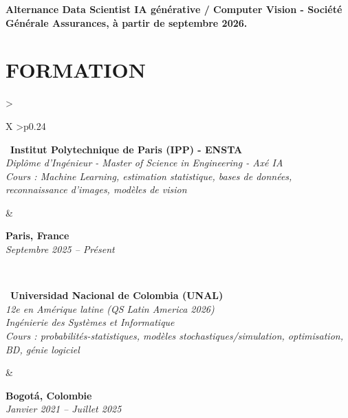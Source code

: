 \documentclass[letterpaper,10pt]{article}
\begin{document}
\textbf{Alternance Data Scientist IA générative / Computer Vision - Société Générale Assurances, à partir de septembre 2026.}


\vspace{-0.04cm}

\section{\textcolor{mydarkgreen}{\textbf{FORMATION}}}

\begin{tabularx}{\textwidth}{>{\raggedright\arraybackslash}X >{\raggedleft\arraybackslash}p{0.24\textwidth}}
  \begin{minipage}[t]{\linewidth}\raggedright
  \textbullet\ \textbf{Institut Polytechnique de Paris (IPP) - ENSTA}\\
  \textit{\footnotesize Diplôme d'Ingénieur - Master of Science in Engineering - Axé IA}\\
  \textit{\footnotesize Cours : Machine Learning, estimation statistique, bases de données, reconnaissance d'images, modèles de vision}
  \end{minipage}
  &
  \begin{minipage}[t]{\linewidth}\raggedleft
  \textbf{Paris, France}\\
  {\footnotesize\textit{Septembre 2025 -- Présent}}
  \end{minipage}
  \\
  \begin{minipage}[t]{\linewidth}
  \textbullet\ \textbf{Universidad Nacional de Colombia (UNAL)}\\
  \textit{\footnotesize 12e en Amérique latine (QS Latin America 2026)}\\
  \textit{\footnotesize Ingénierie des Systèmes et Informatique}\\
  \textit{\footnotesize Cours : probabilités-statistiques, modèles stochastiques/simulation, optimisation, BD, génie logiciel}
  \end{minipage}
  &
  \begin{minipage}[t]{\linewidth}\raggedleft
  \textbf{Bogotá, Colombie}\\
  {\footnotesize\textit{Janvier 2021 -- Juillet 2025}}
  \end{minipage}

\end{tabularx}
\end{document}
